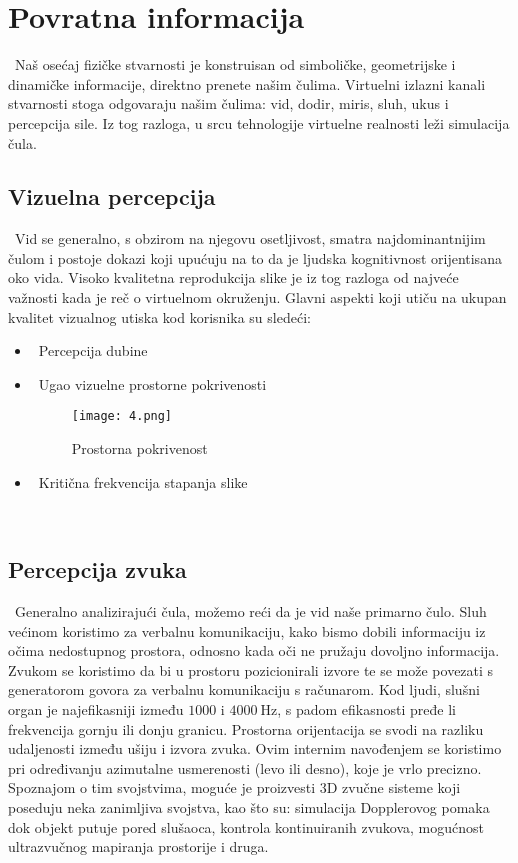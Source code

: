 \documentclass[a4paper]{article}
\begin{document}
\section{Povratna informacija}
\label{sec:povratna informacija}
\indent~Naš osećaj fizičke stvarnosti je konstruisan od simboličke, geometrijske  i dinamičke informacije, direktno prenete našim čulima. Virtuelni izlazni kanali stvarnosti stoga odgovaraju našim čulima: vid, dodir, miris, sluh, ukus i percepcija sile. Iz tog razloga, u srcu tehnologije virtuelne realnosti leži simulacija čula.\cite{1}

\subsection{Vizuelna percepcija}
\label{subsec:vizuelna percepcija}
\indent~Vid se generalno, s obzirom na njegovu osetljivost, smatra najdominantnijim čulom i postoje dokazi koji upućuju na to da je ljudska kognitivnost orijentisana oko vida. Visoko kvalitetna reprodukcija slike je iz tog razloga od najveće važnosti kada je reč o virtuelnom okruženju. Glavni aspekti koji utiču na ukupan kvalitet vizualnog utiska kod korisnika su sledeći:
\begin{itemize}
\item~Percepcija dubine
\item~Ugao vizuelne prostorne pokrivenosti
\begin{figure}[h!]
\begin{center}
\texttt{[image: 4.png]}
\label{4}
\caption{Prostorna pokrivenost}
\end{center}
\end{figure}
\item~Kritična frekvencija stapanja slike
\end{itemize}\\


\subsection{Percepcija zvuka}
\label{subsec:percepcija zvuka}
\indent~Generalno analizirajući čula, možemo reći da je vid naše primarno čulo. Sluh većinom koristimo za verbalnu komunikaciju, kako bismo dobili informaciju iz očima nedostupnog prostora, odnosno kada oči ne pružaju dovoljno informacija. Zvukom se koristimo da bi u prostoru pozicionirali izvore te se može povezati s generatorom govora za verbalnu komunikaciju s računarom. Kod ljudi, slušni organ je najefikasniji između $1000$  i $4000~\mathrm{Hz}$, s padom efikasnosti pređe li frekvencija gornju ili donju granicu. Prostorna orijentacija se svodi na razliku udaljenosti između ušiju i izvora zvuka. Ovim internim navođenjem se koristimo pri određivanju azimutalne usmerenosti (levo ili desno), koje je vrlo precizno. Spoznajom o tim svojstvima, moguće je proizvesti $3$D zvučne sisteme koji poseduju neka zanimljiva svojstva, kao što su: simulacija Dopplerovog pomaka dok objekt putuje pored slušaoca, kontrola kontinuiranih zvukova, mogućnost ultrazvučnog mapiranja prostorije i druga.
\end{document}
